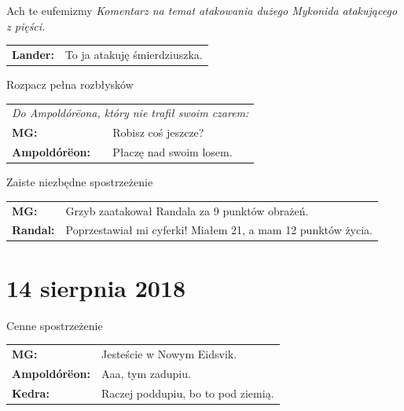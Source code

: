 \documentclass[10pt,twoside,twocolumn]{book}
\begin{document}
\begin{rpg-quotebox}{Ach te eufemizmy}
   \textit{Komentarz na temat atakowania dużego Mykonida atakującego z pięści.}\\

   \begin{tabularx}{\columnwidth}{lX}
      \textbf{Lander:} & To ja atakuję śmierdziuszka.\\
   \end{tabularx}
\end{rpg-quotebox}


\begin{rpg-quotebox}{Rozpacz pełna rozbłysków}
   \begin{tabularx}{\columnwidth}{lX}
      \multicolumn{2}{l}{\textit{Do Ampoldórëona, który nie trafił swoim czarem:}}\\
      \textbf{MG:} & Robisz coś jeszcze?\\
      \textbf{Ampoldórëon:} & Płaczę nad swoim losem.\\
   \end{tabularx}
\end{rpg-quotebox}


\begin{rpg-quotebox}{Zaiste niezbędne spostrzeżenie}
   \begin{tabularx}{\columnwidth}{lX}
      \textbf{MG:} & Grzyb zaatakował Randala za 9 punktów obrażeń.\\
      \textbf{Randal:} & Poprzestawiał mi cyferki! Miałem 21, a mam 12 punktów życia.\\
   \end{tabularx}
\end{rpg-quotebox}


\section*{14 sierpnia 2018}


\begin{rpg-quotebox}{Cenne spostrzeżenie}
   \begin{tabularx}{\columnwidth}{lX}
      \textbf{MG:} & Jesteście w Nowym Eidsvik.\\
      \textbf{Ampoldórëon:} & Aaa, tym zadupiu.\\
      \textbf{Kedra:} & Raczej poddupiu, bo to pod ziemią.\\
   \end{tabularx}
\end{rpg-quotebox}
\end{document}
